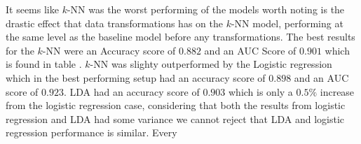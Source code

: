 \documentclass[../../project.tex]{subfiles}
\begin{document}
	It seems like $k$-NN was the worst performing of the models worth noting is the drastic effect that data transformations has on the $k$-NN model, performing at the same level as the baseline model before any transformations. The best results for the $k$-NN were an Accuracy score of $0.882$ and an AUC Score of $0.901$ which is found in table . $k$-NN was slighty outperformed by the Logistic regression which in the best performing setup had an accuracy score of $0.898$ and an AUC score of $0.923$. LDA had an accuracy score of $0.903$ which is only a $0.5\%$ increase from the logistic regression case, considering that both the results from logistic regression and LDA had some variance we cannot reject that LDA and logistic regression performance is similar.
	Every 
	
	
	
	
\end{document}
